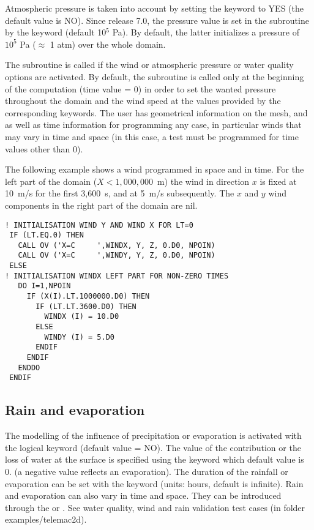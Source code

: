 Atmospheric pressure is taken into account by setting the keyword
 to YES (the default value is NO).
Since release 7.0, the pressure value is set in the 
subroutine by the keyword 
(default 10$^5$ Pa).
By default, the latter initializes a pressure of $10^5$ Pa ($\approx$ 1 atm)
over the whole domain.

The  subroutine is called if the wind or atmospheric pressure
or water quality options are activated.
By default, the subroutine is called only at the beginning of the computation
(time value = 0) in order to set the wanted pressure throughout the domain
and the wind speed at the values provided by the corresponding keywords.
The user has geometrical information on the mesh, and as well as time
information for programming any case, in particular winds that may vary in time
and space (in this case, a test must be programmed for time values other than 0).

The following example shows a wind programmed in space and in time.
For the left part of the domain ($ X < 1,000,000$~m) the wind in direction $x$
is fixed at 10~m/s for the first 3,600~s, and at 5~m/s subsequently.
The $x$ and $y$ wind components in the right part of the domain are nil.

\begin{lstlisting}[language=TelFortran]
! INITIALISATION WIND Y AND WIND X FOR LT=0
 IF (LT.EQ.0) THEN
   CALL OV ('X=C     ',WINDX, Y, Z, 0.D0, NPOIN)
   CALL OV ('X=C     ',WINDY, Y, Z, 0.D0, NPOIN)
 ELSE
! INITIALISATION WINDX LEFT PART FOR NON-ZERO TIMES
   DO I=1,NPOIN
     IF (X(I).LT.1000000.D0) THEN
       IF (LT.LT.3600.D0) THEN
         WINDX (I) = 10.D0
       ELSE
         WINDY (I) = 5.D0
       ENDIF
     ENDIF
   ENDDO
 ENDIF
\end{lstlisting}

\subsection{Rain and evaporation}

The modelling of the influence of precipitation or evaporation is activated
with the logical keyword  (default value = NO).
The value of the contribution or the loss of water at the surface is specified
using the keyword  which default value
is 0. (a negative value reflects an evaporation).
The duration of the rainfall or evaporation can be set with the keyword
 (units: hours, default is
infinite).
Rain and evaporation can also vary in time and space.
They can be introduced through the 
or .
See water quality, wind and rain validation test cases (in folder
examples/telemac2d).

